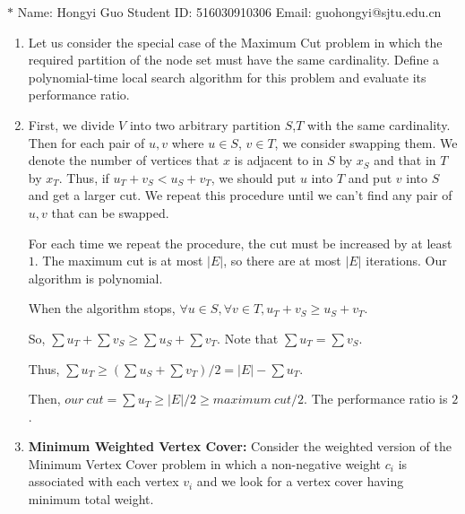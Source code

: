 \documentclass[12pt,a4paper]{article}
\makeatletter
\newtheorem*{solution}{Solution}
\theoremstyle{definition}
\renewenvironment{solution}[1][Solution] {\par\pushQED{\qed}\normalfont\topsep6\p@\@plus6\p@\relax\trivlist\item[\hskip\labelsep\bfseries#1\@addpunct{.}]\ignorespaces}{\popQED\endtrivlist\@endpefalse} \makeatother
\makeatother
\begin{document}
\noindent

\noindent{}
\begin{center}
\footnotesize{\color{blue}$*$ Name: Hongyi Guo  \quad Student ID: 516030910306 \quad Email: guohongyi@sjtu.edu.cn}
\end{center}

\begin{enumerate}
\item
Let us consider the special case of the Maximum Cut problem in which the required partition of the node set must have the same cardinality. Define a polynomial-time local search algorithm for this problem and evaluate its performance ratio.

\begin{solution}
  First, we divide $V$ into two arbitrary partition $S$,$T$ with the same cardinality. Then for each pair of $u,v$ where $u\in S$, $v\in T$, we consider swapping them. We denote the number of vertices that $x$ is adjacent to in $S$ by $x_S$ and that in $T$ by $x_T$. Thus, if $u_T + v_S < u_S + v_T$, we should put $u$ into $T$ and put $v$ into $S$ and get a larger cut. We repeat this procedure until we can't find any pair of $u,v$ that can be swapped.

  For each time we repeat the procedure, the cut must be increased by at least $1$. The maximum cut is at most $|E|$, so there are at most $|E|$ iterations. Our algorithm is polynomial.

  When the algorithm stops, $\forall u\in S, \forall v\in T, u_T + v_S \geq u_S + v_T$. 
  
  So, $\sum u_T + \sum v_S \geq \sum u_S + \sum v_T$. Note that $\sum u_T = \sum v_S$.
  
  Thus, $\sum u_T \geq (\sum u_S + \sum v_T)/2 = |E| - \sum u_T$.

  Then, $our~cut = \sum u_T \geq |E|/2 \geq maximum~cut / 2$. The performance ratio is $2$.
\end{solution}

\item
\textbf{Minimum Weighted Vertex Cover:} Consider the weighted version of the Minimum Vertex Cover problem in which a non-negative weight $c_i$ is associated with each vertex $v_i$ and we look for a vertex cover having minimum total weight.


\end{enumerate}
\end{document}

